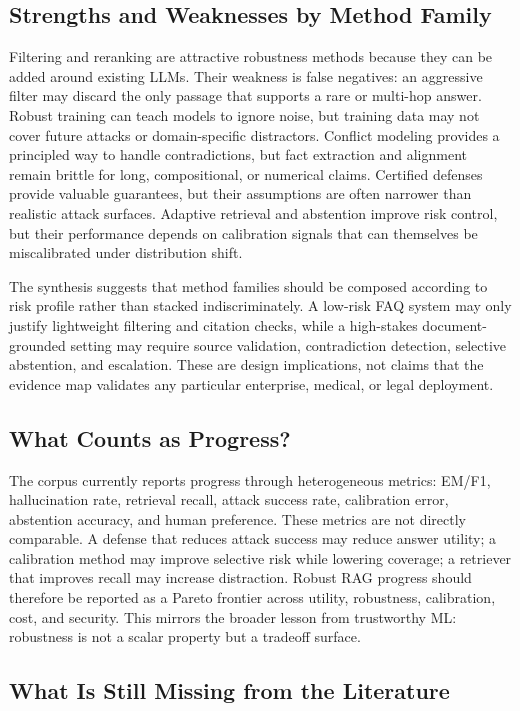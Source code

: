 \subsection{Strengths and Weaknesses by Method Family}

Filtering and reranking are attractive robustness methods because they can be added around existing LLMs. Their weakness is false negatives: an aggressive filter may discard the only passage that supports a rare or multi-hop answer. Robust training can teach models to ignore noise, but training data may not cover future attacks or domain-specific distractors. Conflict modeling provides a principled way to handle contradictions, but fact extraction and alignment remain brittle for long, compositional, or numerical claims. Certified defenses provide valuable guarantees, but their assumptions are often narrower than realistic attack surfaces. Adaptive retrieval and abstention improve risk control, but their performance depends on calibration signals that can themselves be miscalibrated under distribution shift.

The synthesis suggests that method families should be composed according to risk profile rather than stacked indiscriminately. A low-risk FAQ system may only justify lightweight filtering and citation checks, while a high-stakes document-grounded setting may require source validation, contradiction detection, selective abstention, and escalation. These are design implications, not claims that the evidence map validates any particular enterprise, medical, or legal deployment.

\subsection{What Counts as Progress?}

The corpus currently reports progress through heterogeneous metrics: EM/F1, hallucination rate, retrieval recall, attack success rate, calibration error, abstention accuracy, and human preference. These metrics are not directly comparable. A defense that reduces attack success may reduce answer utility; a calibration method may improve selective risk while lowering coverage; a retriever that improves recall may increase distraction. Robust RAG progress should therefore be reported as a Pareto frontier across utility, robustness, calibration, cost, and security. This mirrors the broader lesson from trustworthy ML: robustness is not a scalar property but a tradeoff surface.

\subsection{What Is Still Missing from the Literature}


